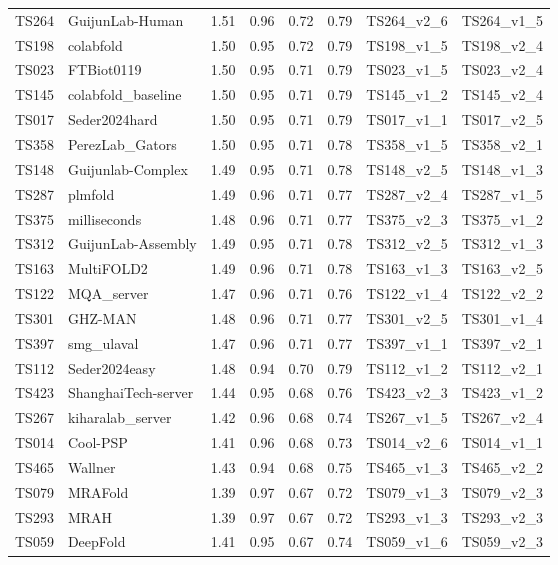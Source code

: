 \begin{longtable}{llllllll}
TS264 & GuijunLab-Human & 1.51 & 0.96 & 0.72 & 0.79 & TS264\_v2\_6 & TS264\_v1\_5 \\ 
TS198 & colabfold & 1.50 & 0.95 & 0.72 & 0.79 & TS198\_v1\_5 & TS198\_v2\_4 \\ 
TS023 & FTBiot0119 & 1.50 & 0.95 & 0.71 & 0.79 & TS023\_v1\_5 & TS023\_v2\_4 \\ 
TS145 & colabfold\_baseline & 1.50 & 0.95 & 0.71 & 0.79 & TS145\_v1\_2 & TS145\_v2\_4 \\ 
TS017 & Seder2024hard & 1.50 & 0.95 & 0.71 & 0.79 & TS017\_v1\_1 & TS017\_v2\_5 \\ 
TS358 & PerezLab\_Gators & 1.50 & 0.95 & 0.71 & 0.78 & TS358\_v1\_5 & TS358\_v2\_1 \\ 
TS148 & Guijunlab-Complex & 1.49 & 0.95 & 0.71 & 0.78 & TS148\_v2\_5 & TS148\_v1\_3 \\ 
TS287 & plmfold & 1.49 & 0.96 & 0.71 & 0.77 & TS287\_v2\_4 & TS287\_v1\_5 \\ 
TS375 & milliseconds & 1.48 & 0.96 & 0.71 & 0.77 & TS375\_v2\_3 & TS375\_v1\_2 \\ 
TS312 & GuijunLab-Assembly & 1.49 & 0.95 & 0.71 & 0.78 & TS312\_v2\_5 & TS312\_v1\_3 \\ 
TS163 & MultiFOLD2 & 1.49 & 0.96 & 0.71 & 0.78 & TS163\_v1\_3 & TS163\_v2\_5 \\ 
TS122 & MQA\_server & 1.47 & 0.96 & 0.71 & 0.76 & TS122\_v1\_4 & TS122\_v2\_2 \\ 
TS301 & GHZ-MAN & 1.48 & 0.96 & 0.71 & 0.77 & TS301\_v2\_5 & TS301\_v1\_4 \\ 
TS397 & smg\_ulaval & 1.47 & 0.96 & 0.71 & 0.77 & TS397\_v1\_1 & TS397\_v2\_1 \\ 
TS112 & Seder2024easy & 1.48 & 0.94 & 0.70 & 0.79 & TS112\_v1\_2 & TS112\_v2\_1 \\ 
TS423 & ShanghaiTech-server & 1.44 & 0.95 & 0.68 & 0.76 & TS423\_v2\_3 & TS423\_v1\_2 \\ 
TS267 & kiharalab\_server & 1.42 & 0.96 & 0.68 & 0.74 & TS267\_v1\_5 & TS267\_v2\_4 \\ 
TS014 & Cool-PSP & 1.41 & 0.96 & 0.68 & 0.73 & TS014\_v2\_6 & TS014\_v1\_1 \\ 
TS465 & Wallner & 1.43 & 0.94 & 0.68 & 0.75 & TS465\_v1\_3 & TS465\_v2\_2 \\ 
TS079 & MRAFold & 1.39 & 0.97 & 0.67 & 0.72 & TS079\_v1\_3 & TS079\_v2\_3 \\ 
TS293 & MRAH & 1.39 & 0.97 & 0.67 & 0.72 & TS293\_v1\_3 & TS293\_v2\_3 \\ 
TS059 & DeepFold & 1.41 & 0.95 & 0.67 & 0.74 & TS059\_v1\_6 & TS059\_v2\_3 \\ 

\end{longtable}
